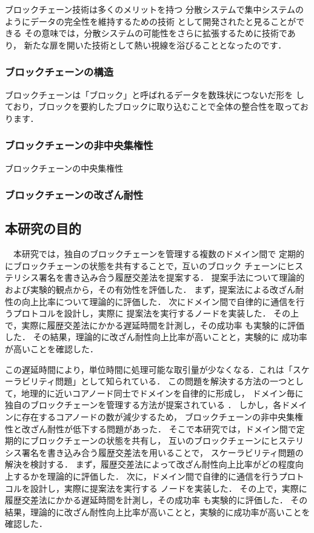 \documentclass[a4paper,12pt]{jsarticle}
\begin{document}
ブロックチェーン技術は多くのメリットを持つ
分散システムで集中システムのようにデータの完全性を維持するための技術
として開発されたと見ることができる
その意味では，分散システムの可能性をさらに拡張するために技術であり，
新たな扉を開いた技術として熱い視線を浴びることとなったのです．

\subsubsection{ブロックチェーンの構造}

ブロックチェーンは「ブロック」と呼ばれるデータを数珠状につないだ形を
しており，ブロックを要約したブロックに取り込むことで全体の整合性を取っております．

\subsubsection{ブロックチェーンの非中央集権性}
ブロックチェーンの中央集権性

\subsubsection{ブロックチェーンの改ざん耐性}


\subsection{本研究の目的}
　本研究では，独自のブロックチェーンを管理する複数のドメイン間で
定期的にブロックチェーンの状態を共有することで，互いのブロック
チェーンにヒステリシス署名を書き込み合う履歴交差法を提案する．
提案手法について理論的および実験的観点から，その有効性を評価した．
まず，提案法による改ざん耐性の向上比率について理論的に評価した．
次にドメイン間で自律的に通信を行うプロトコルを設計し，実際に
提案法を実行するノードを実装した．
その上で，実際に履歴交差法にかかる遅延時間を計測し，その成功率
も実験的に評価した．
その結果，理論的に改ざん耐性向上比率が高いことと，実験的に
成功率が高いことを確認した．

この遅延時間により，単位時間に処理可能な取引量が少なくなる．これは「スケーラビリティ問題」として知られている．
この問題を解決する方法の一つとして，地理的に近いコアノード同士でドメインを自律的に形成し，
ドメイン毎に独自のブロックチェーンを管理する方法が提案されている \cite{fujihara1}\cite{fujihara2}．
しかし，各ドメインに存在するコアノードの数が減少するため，
ブロックチェーンの非中央集権性と改ざん耐性が低下する問題があった．
そこで本研究では，ドメイン間で定期的にブロックチェーンの状態を共有し，
互いのブロックチェーンにヒステリシス署名\cite{suzaki}を書き込み合う履歴交差法を用いることで，
スケーラビリティ問題の解決を検討する．
まず，履歴交差法によって改ざん耐性向上比率がどの程度向上するかを理論的に評価した．
次に，ドメイン間で自律的に通信を行うプロトコルを設計し，実際に提案法を実行する
ノードを実装した．
その上で，実際に履歴交差法にかかる遅延時間を計測し，その成功率
も実験的に評価した．
その結果，理論的に改ざん耐性向上比率が高いことと，実験的に成功率が高いことを確認した．
\end{document}
